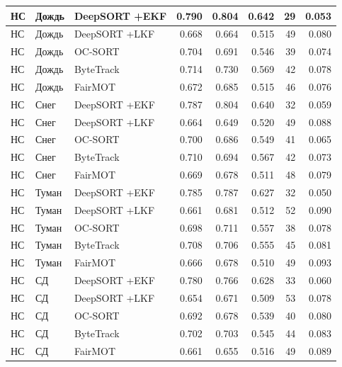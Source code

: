 \begin{longtable}{|p{2.42cm}|p{1.8cm}|p{2.4cm}|r|r|r|r|r|}
       НС     &      Дождь & DeepSORT +EKF & 0.790 & 0.804 & 0.642 &   29 & 0.053  \\ \hline
       НС     &      Дождь & DeepSORT +LKF & 0.668 & 0.664 & 0.515 &   49 & 0.080  \\ \hline
       НС     &      Дождь &      OC-SORT & 0.704 & 0.691 & 0.546 &   39 & 0.074  \\ \hline
       НС     &      Дождь &    ByteTrack & 0.714 & 0.730 & 0.569 &   42 & 0.078  \\ \hline
       НС     &      Дождь &      FairMOT & 0.672 & 0.685 & 0.515 &   46 & 0.076  \\ \hline
       НС     &      Снег & DeepSORT +EKF & 0.787 & 0.804 & 0.640 &   32 & 0.059  \\ \hline
       НС     &      Снег & DeepSORT +LKF & 0.664 & 0.649 & 0.520 &   49 & 0.088  \\ \hline
       НС     &      Снег &      OC-SORT & 0.700 & 0.686 & 0.549 &   41 & 0.065  \\ \hline
       НС     &      Снег &    ByteTrack & 0.710 & 0.694 & 0.567 &   42 & 0.073  \\ \hline
       НС     &      Снег &      FairMOT & 0.669 & 0.678 & 0.511 &   48 & 0.079  \\ \hline
       НС     &      Туман & DeepSORT +EKF & 0.785 & 0.787 & 0.627 &   32 & 0.050  \\ \hline
       НС     &      Туман & DeepSORT +LKF & 0.661 & 0.681 & 0.512 &   52 & 0.090  \\ \hline
       НС     &      Туман &      OC-SORT & 0.698 & 0.711 & 0.557 &   38 & 0.078  \\ \hline
       НС     &      Туман &    ByteTrack & 0.708 & 0.706 & 0.555 &   45 & 0.081  \\ \hline
       НС     &      Туман &      FairMOT & 0.666 & 0.678 & 0.510 &   49 & 0.093  \\ \hline
       НС     &      СД & DeepSORT +EKF & 0.780 & 0.766 & 0.628 &   33 & 0.060  \\ \hline
       НС     &      СД & DeepSORT +LKF & 0.654 & 0.671 & 0.509 &   53 & 0.078  \\ \hline
       НС     &      СД &      OC-SORT & 0.692 & 0.678 & 0.539 &   40 & 0.080  \\ \hline
       НС     &      СД &    ByteTrack & 0.702 & 0.703 & 0.545 &   44 & 0.083  \\ \hline
       НС     &      СД &      FairMOT & 0.661 & 0.655 & 0.516 &   49 & 0.089  \\ \hline

\end{longtable}
